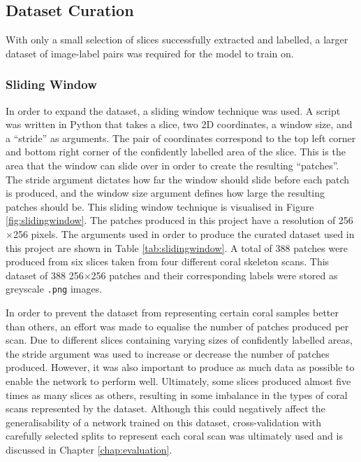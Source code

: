 \subsection{Dataset Curation}
\label{sec:datasetcuration}

With only a small selection of slices successfully extracted and labelled, a larger dataset of image-label pairs was required for the model to train on.

\subsubsection{Sliding Window}

In order to expand the dataset, a sliding window technique was used. A script was written in Python that takes a slice, two 2D coordinates, a window size, and a ``stride'' as arguments. The pair of coordinates correspond to the top left corner and bottom right corner of the confidently labelled area of the slice. This is the area that the window can slide over in order to create the resulting ``patches''. The stride argument dictates how far the window should slide before each patch is produced, and the window size argument defines how large the resulting patches should be. This sliding window technique is visualised in Figure \ref{fig:slidingwindow}. The patches produced in this project have a resolution of 256$\times$256 pixels. The arguments used in order to produce the curated dataset used in this project are shown in Table \ref{tab:slidingwindow}. A total of 388 patches were produced from six slices taken from four different coral skeleton scans. This dataset of 388 256$\times$256 patches and their corresponding labels were stored as greyscale \texttt{.png} images.

In order to prevent the dataset from representing certain coral samples better than others, an effort was made to equalise the number of patches produced per scan. Due to different slices containing varying sizes of confidently labelled areas, the stride argument was used to increase or decrease the number of patches produced. However, it was also important to produce as much data as possible to enable the network to perform well. Ultimately, some slices produced almost five times as many slices as others, resulting in some imbalance in the types of coral scans represented by the dataset. Although this could negatively affect the generalisability of a network trained on this dataset, cross-validation with carefully selected splits to represent each coral scan was ultimately used and is discussed in Chapter \ref{chap:evaluation}.

